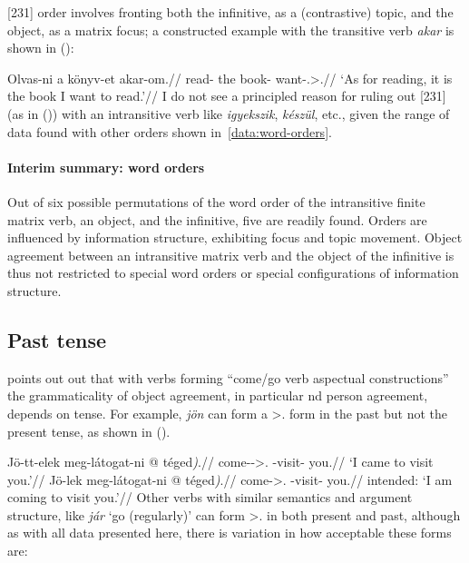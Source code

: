 [231] order involves fronting both the infinitive, as a (contrastive) topic,
and the object, as a matrix focus; a constructed example with the transitive
verb \emph{akar} is shown in (\nextx):

\ex
    \begingl
        \gla 	Olvas-ni a könyv-et akar-om.//
        \glb 	read-\Inf{} the book-\Acc{} want-\Fsg.\Sbj>\Third.\Obj{}//
        \glft 	\enquote*{As for reading, it is the book I want to read.}//
    \endgl
\xe
I do not see a principled reason for ruling out [231] (as in (\lastx)) with an
intransitive verb like \emph{igyekszik}, \emph{készül}, etc., given the range
of data found with other orders shown in~\eqref{data:word-orders}.

\paragraph{Interim summary: word orders}

Out of six possible permutations of the word order of the intransitive finite
matrix verb, an object, and the infinitive, five are readily found. Orders are
influenced by information structure, exhibiting focus and topic movement.
Object agreement between an intransitive matrix verb and the object of the
infinitive is thus not restricted to special word orders or special
configurations of information structure.

\subsection{Past tense}\label{sub:past-tense}

\Textcite{denDikken2004} points out out that with verbs forming
\enquote{come/go verb aspectual constructions} the grammaticality of object
agreement, in particular \Second{}nd person agreement, depends on tense. For
example, \emph{jön} can form a \Fsg>\Second.\Obj{} form in the past but not the
present tense, as shown in (\nextx).

\pex
    \a
    \begingl
        \gla 	Jö-tt-elek meg-látogat-ni \nogloss{(} @ téged\emph{)}.//
        \glb 	come-\Pst-\Fsg>\Second.\Obj{} \Vm-visit-\Inf{} you.\Acc{}//
        \glft 	\enquote*{I came to visit you.}//
    \endgl
    \a
    \begingl
        \gla 	\ljudge*Jö-lek meg-látogat-ni \nogloss{(} @ téged\emph{)}.//
        \glb 	come-\Fsg>\Second.\Obj{} \Vm-visit-\Inf{} you.\Acc{}//
        \glft 	intended: \enquote*{I am coming to visit you.}//
    \endgl
\xe
Other verbs with similar semantics and argument structure, like \emph{jár}
\enquote*{go (regularly)} can form \Fsg>\Second.\Obj{} in both present and
past, although as with all data presented here, there is variation in how
acceptable these forms are:

